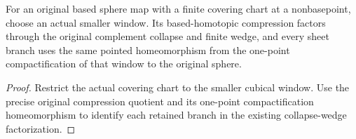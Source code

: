 \begin{proposition}
  \label{prop:actual-sphere-finite-sheet-homeomorphisms}
  \leanok
  For an original based sphere map with a finite covering chart at a nonbasepoint, choose an actual smaller window. Its based-homotopic compression factors through the original complement collapse and finite wedge, and every sheet branch uses the same pointed homeomorphism from the one-point compactification of that window to the original sphere.
\end{proposition}
\begin{proof}
  Restrict the actual covering chart to the smaller cubical window. Use the precise original compression quotient and its one-point compactification homeomorphism to identify each retained branch in the existing collapse-wedge factorization.
  \leanok
\end{proof}

